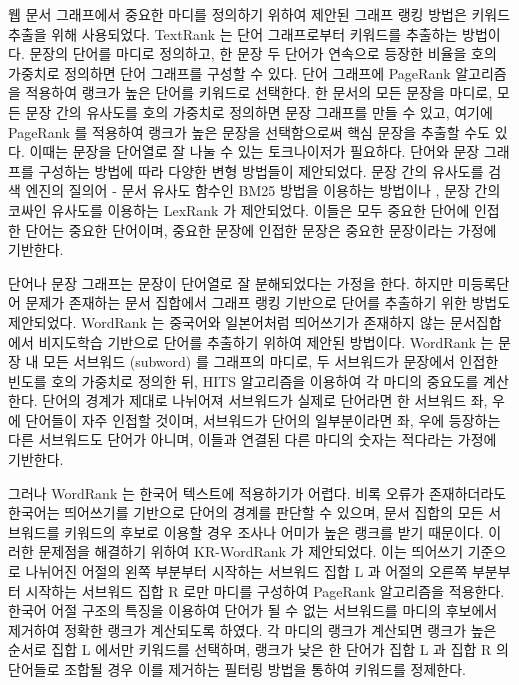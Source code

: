 \documentclass[11pt]{article}
\begin{document}
웹 문서 그래프에서 중요한 마디를 정의하기 위하여 제안된 그래프 랭킹 방법은 키워드 추출을 위해 사용되었다.
TextRank \citep{mihalcea2004textrank} 는 단어 그래프로부터 키워드를 추출하는 방법이다.
문장의 단어를 마디로 정의하고, 한 문장 두 단어가 연속으로 등장한 비율을 호의 가중치로 정의하면 단어 그래프를 구성할 수 있다.
단어 그래프에 PageRank 알고리즘을 적용하여 랭크가 높은 단어를 키워드로 선택한다.
한 문서의 모든 문장을 마디로, 모든 문장 간의 유사도를 호의 가중치로 정의하면 문장 그래프를 만들 수 있고, 여기에 PageRank 를 적용하여 랭크가 높은 문장을 선택함으로써 핵심 문장을 추출할 수도 있다.
이때는 문장을 단어열로 잘 나눌 수 있는 토크나이저가 필요하다.
단어와 문장 그래프를 구성하는 방법에 따라 다양한 변형 방법들이 제안되었다.
문장 간의 유사도를 검색 엔진의 질의어 - 문서 유사도 함수인 BM25 \citep{robertson2009probabilistic} 방법을 이용하는 방법이나 \citep{barrios2016variations}, 문장 간의 코싸인 유사도를 이용하는 LexRank \citep{erkan2004lexrank} 가 제안되었다.
이들은 모두 중요한 단어에 인접한 단어는 중요한 단어이며, 중요한 문장에 인접한 문장은 중요한 문장이라는 가정에 기반한다.

단어나 문장 그래프는 문장이 단어열로 잘 분해되었다는 가정을 한다.
하지만 미등록단어 문제가 존재하는 문서 집합에서 그래프 랭킹 기반으로 단어를 추출하기 위한 방법도 제안되었다.
WordRank \citep{chen2011simple} 는 중국어와 일본어처럼 띄어쓰기가 존재하지 않는 문서집합에서 비지도학습 기반으로 단어를 추출하기 위하여 제안된 방법이다.
WordRank 는 문장 내 모든 서브워드 (subword) 를 그래프의 마디로, 두 서브워드가 문장에서 인접한 빈도를 호의 가중치로 정의한 뒤, HITS 알고리즘을 이용하여 각 마디의 중요도를 계산한다.
단어의 경계가 제대로 나뉘어져 서브워드가 실제로 단어라면 한 서브워드 좌, 우에 단어들이 자주 인접할 것이며, 서브워드가 단어의 일부분이라면 좌, 우에 등장하는 다른 서브워드도 단어가 아니며, 이들과 연결된 다른 마디의 숫자는 적다라는 가정에 기반한다.

그러나 WordRank 는 한국어 텍스트에 적용하기가 어렵다.
비록 오류가 존재하더라도 한국어는 띄어쓰기를 기반으로 단어의 경계를 판단할 수 있으며, 문서 집합의 모든 서브워드를 키워드의 후보로 이용할 경우 조사나 어미가 높은 랭크를 받기 때문이다.
이러한 문제점을 해결하기 위하여 KR-WordRank \citep{kim2014kr} 가 제안되었다.
이는 띄어쓰기 기준으로 나뉘어진 어절의 왼쪽 부분부터 시작하는 서브워드 집합 L 과 어절의 오른쪽 부분부터 시작하는 서브워드 집합 R 로만 마디를 구성하여 PageRank 알고리즘을 적용한다.
한국어 어절 구조의 특징을 이용하여 단어가 될 수 없는 서브워드를 마디의 후보에서 제거하여 정확한 랭크가 계산되도록 하였다.
각 마디의 랭크가 계산되면 랭크가 높은 순서로 집합 L 에서만 키워드를 선택하며, 랭크가 낮은 한 단어가 집합 L 과 집합 R 의 단어들로 조합될 경우 이를 제거하는 필터링 방법을 통하여 키워드를 정제한다.
\end{document}

